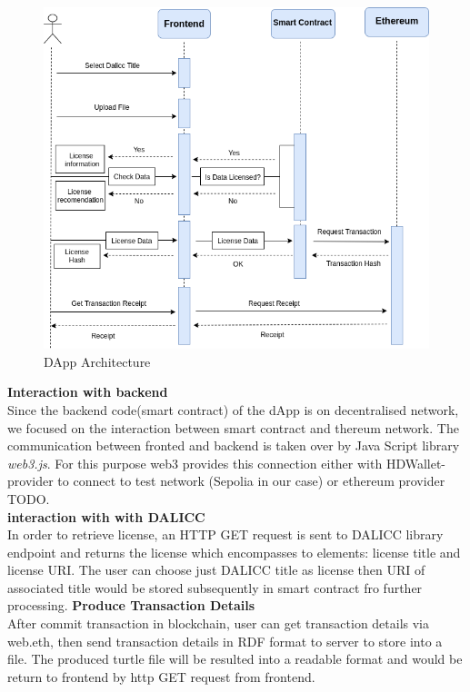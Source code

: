  \begin{center}
 	
 	\begin{figure}[htb!]
 		
 		\begin{minipage}{0.75\linewidth}
 			
 			\includegraphics[width=1.45\textwidth]{images/chap03_user_roadmap.png}
 		\end{minipage}
 		\caption{DApp Architecture}
 		
 	\end{figure}
 	
 \end{center}
 \textbf{Interaction with backend}\\
 Since the backend code(smart contract) of the dApp is on decentralised network, we focused on the interaction between smart contract and thereum network. The communication between fronted and backend is taken over by Java Script library \textit{web3.js}.
 For this purpose web3 provides this connection either with HDWallet-provider to connect to test network (Sepolia in our case) or ethereum provider TODO.\\
 \textbf{interaction with with DALICC} \\
 In order to retrieve license, an HTTP GET request is sent to DALICC library endpoint and returns the license which encompasses to elements: license title and license URI. The user can choose just DALICC title as license then URI of associated title would be stored subsequently in smart contract fro further processing. 
\textbf{Produce Transaction Details}\\
After commit transaction in blockchain, user can get transaction details via web.eth, then send transaction details in RDF format to server to store into a file. The produced turtle file will be resulted into a readable format and would be return to frontend  by http GET request from frontend.\\
\\
\\

